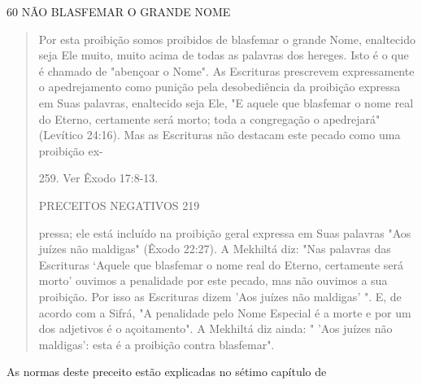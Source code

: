 60 NÃO BLASFEMAR O GRANDE NOME

\begin{quote}
Por esta proibição somos proibidos de blasfemar o grande Nome,
enaltecido seja Ele muito, muito acima de todas as palavras dos hereges.
Isto é o que é chamado de "abençoar o Nome". As Escrituras prescrevem
expressa­mente o apedrejamento como punição pela desobediência da
proibição expressa em Suas palavras, enaltecido seja Ele, "E aquele que
blasfemar o nome real do Eterno, certamente será morto; toda a
congregação o apedrejará" (Levítico 24:16). Mas as Escrituras não
destacam este pecado como uma proibição ex-

259. Ver Êxodo 17:8-13.

PRECEITOS NEGATIVOS 219

pressa; ele está incluído na proibição geral expressa em Suas palavras
"Aos juí­zes não maldigas" (Êxodo 22:27). A Mekhiltá diz: "Nas palavras
das Escrituras `Aquele que blasfemar o nome real do Eterno, certamente
será morto' ouvimos a penalidade por este pecado, mas não ouvimos a sua
proibição. Por isso as Escrituras dizem 'Aos juízes não maldigas' ". E,
de acordo com a Sifrá, "A pe­nalidade pelo Nome Especial é a morte e por
um dos adjetivos é o açoitamen­to". A Mekhiltá diz ainda: " 'Aos juízes
não maldigas': esta é a proibição contra blasfemar".
\end{quote}

As normas deste preceito estão explicadas no sétimo capítulo de

